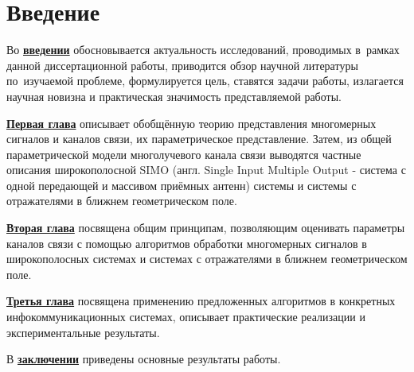 \chapter*{Введение}                         %

Во \underline{\textbf{введении}} обосновывается актуальность
исследований, проводимых в~рамках данной диссертационной работы,
приводится обзор научной литературы по~изучаемой проблеме,
формулируется цель, ставятся задачи работы, излагается научная новизна
и практическая значимость представляемой работы. 

\underline{\textbf{Первая глава}} описывает обобщённую теорию представления многомерных сигналов и каналов связи, их параметрическое представление. Затем, из общей параметрической модели многолучевого канала связи выводятся частные описания широкополосной SIMO (англ. Single Input Multiple Output - система с одной передающей и массивом приёмных антенн) системы и системы с отражателями в ближнем геометрическом поле.

\underline{\textbf{Вторая глава}} посвящена общим принципам, позволяющим оценивать параметры каналов связи с помощью алгоритмов обработки многомерных сигналов в широкополосных системах и системах с отражателями в ближнем геометрическом поле.

\underline{\textbf{Третья глава}} посвящена применению предложенных алгоритмов в конкретных инфокоммуникационных системах, описывает практические реализации и экспериментальные результаты.

В \underline{\textbf{заключении}} приведены основные результаты работы.